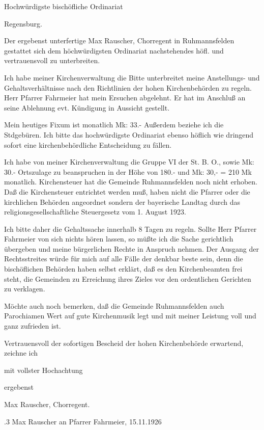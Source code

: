 \documentclass{book}
\begin{document}
    Hochwürdigste bischöfliche Ordinariat

                    Regensburg.



Der ergebenst unterfertige Max Rauscher, Chorregent in Ruhmannsfelden gestattet
sich dem höchwürdigsten Ordinariat nachstehendes höfl. und vertrauensvoll zu
unterbreiten.

Ich habe meiner Kirchenverwaltung die Bitte unterbreitet meine Anstellungs- und
Gehaltsverhältnisse nach den Richtlinien der hohen Kirchenbehörden zu regeln.
Herr Pfarrer Fahrmeier hat mein Ersuchen abgelehnt. Er hat im Anschluß an seine
Ablehnung evt. Kündigung in Aussicht gestellt.

Mein heutiges Fixum ist monatlich Mk: 33.- Außerdem beziehe ich die Stdgebüren.
Ich bitte das hochwürdigste Ordinariat ebenso höflich wie dringend sofort eine
kirchenbehördliche Entscheidung zu fällen.

Ich habe von meiner Kirchenverwaltung die Gruppe VI der St. B. O., sowie Mk:
30.- Ortszulage zu beanspruchen in der Höhe von 180.- und Mk: 30,- = 210 Mk
monatlich. Kirchensteuer hat die Gemeinde Ruhmannsfelden noch nicht erhoben. Daß
die Kirchensteuer entrichtet werden muß, haben nicht die Pfarrer oder die
kirchlichen Behörden angeordnet sondern der bayerische Landtag durch das
religionsgesellschaftliche Steuergesetz vom 1. August 1923.

Ich bitte daher die Gehaltssache innerhalb 8 Tagen zu regeln. Sollte Herr
Pfarrer Fahrmeier von sich nichts hören lassen, so müßte ich die Sache
gerichtlich übergeben und meine bürgerlichen Rechte in Anspruch nehmen. Der
Ausgang der Rechtsstreites würde für mich auf alle Fälle der denkbar beste sein,
denn die bischöflichen Behörden haben selbst erklärt, daß es den Kirchenbeamten
frei steht, die Gemeinden zu Erreichung ihres Zieles vor den ordentlichen
Gerichten zu verklagen.

Möchte auch noch bemerken, daß die Gemeinde Ruhmannsfelden auch Parochiamen Wert
auf gute Kirchenmusik legt und mit meiner Leistung voll und ganz zufrieden ist.

Vertrauensvoll der sofortigen Bescheid der hohen Kirchenbehörde erwartend,
zeichne ich



mit vollster Hochachtung

ergebenst

Max Rauscher, Chorregent.

.3 Max Rauscher an Pfarrer Fahrmeier, 15.11.1926
\end{document}
